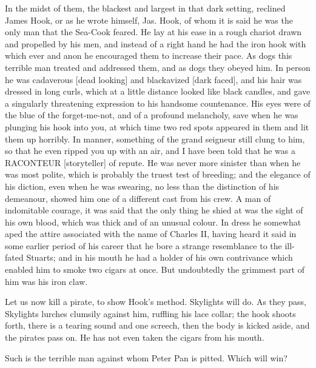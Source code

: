 In the midst of them, the blackest and largest in that dark setting,
reclined James Hook, or as he wrote himself, Jas. Hook, of whom it is said
he was the only man that the Sea-Cook feared. He lay at his ease in a
rough chariot drawn and propelled by his men, and instead of a right hand
he had the iron hook with which ever and anon he encouraged them to
increase their pace. As dogs this terrible man treated and addressed them,
and as dogs they obeyed him. In person he was cadaverous [dead looking]
and blackavized [dark faced], and his hair was dressed in long curls,
which at a little distance looked like black candles, and gave a
singularly threatening expression to his handsome countenance. His eyes
were of the blue of the forget-me-not, and of a profound melancholy, save
when he was plunging his hook into you, at which time two red spots
appeared in them and lit them up horribly. In manner, something of the
grand seigneur still clung to him, so that he even ripped you up with an
air, and I have been told that he was a RACONTEUR [storyteller] of repute.
He was never more sinister than when he was most polite, which is probably
the truest test of breeding; and the elegance of his diction, even when he
was swearing, no less than the distinction of his demeanour, showed him
one of a different cast from his crew. A man of indomitable courage, it
was said that the only thing he shied at was the sight of his own blood,
which was thick and of an unusual colour. In dress he somewhat aped the
attire associated with the name of Charles II, having heard it said in
some earlier period of his career that he bore a strange resemblance to
the ill-fated Stuarts; and in his mouth he had a holder of his own
contrivance which enabled him to smoke two cigars at once. But undoubtedly
the grimmest part of him was his iron claw.


Let us now kill a pirate, to show Hook's method. Skylights will do. As
they pass, Skylights lurches clumsily against him, ruffling his lace
collar; the hook shoots forth, there is a tearing sound and one screech,
then the body is kicked aside, and the pirates pass on. He has not even
taken the cigars from his mouth.


Such is the terrible man against whom Peter Pan is pitted. Which will win?


